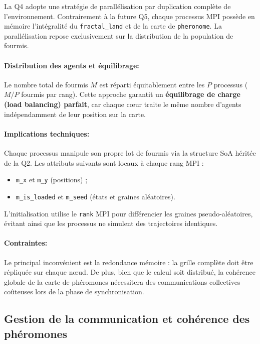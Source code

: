 \documentclass[11pt,a4paper]{article}
\begin{document}
La Q4 adopte une stratégie de parallélisation par duplication complète de l’environnement. Contrairement à la future Q5, chaque processus MPI possède en mémoire l'intégralité du \texttt{fractal\_land} et de la carte de \texttt{pheronome}. La parallélisation repose exclusivement sur la distribution de la population de fourmis.

\paragraph{Distribution des agents et équilibrage: }
Le nombre total de fourmis $M$ est réparti équitablement entre les $P$ processus ($M/P$ fourmis par rang). Cette approche garantit un \textbf{équilibrage de charge (load balancing) parfait}, car chaque cœur traite le même nombre d'agents indépendamment de leur position sur la carte.

\paragraph{Implications techniques: }
Chaque processus manipule son propre lot de fourmis via la structure SoA héritée de la Q2. Les attributs suivants sont locaux à chaque rang MPI :
\begin{itemize}[leftmargin=1.2em]
  \item \texttt{m\_x} et \texttt{m\_y} (positions) ;
  \item \texttt{m\_is\_loaded} et \texttt{m\_seed} (états et graines aléatoires).
\end{itemize}

L'initialisation utilise le \texttt{rank} MPI pour différencier les graines pseudo-aléatoires, évitant ainsi que les processus ne simulent des trajectoires identiques.

\paragraph{Contraintes: }
Le principal inconvénient est la redondance mémoire : la grille complète doit être répliquée sur chaque nœud. De plus, bien que le calcul soit distribué, la cohérence globale de la carte de phéromones nécessitera des communications collectives coûteuses lors de la phase de synchronisation.


\subsection{Gestion de la communication et cohérence des phéromones}
\end{document}
